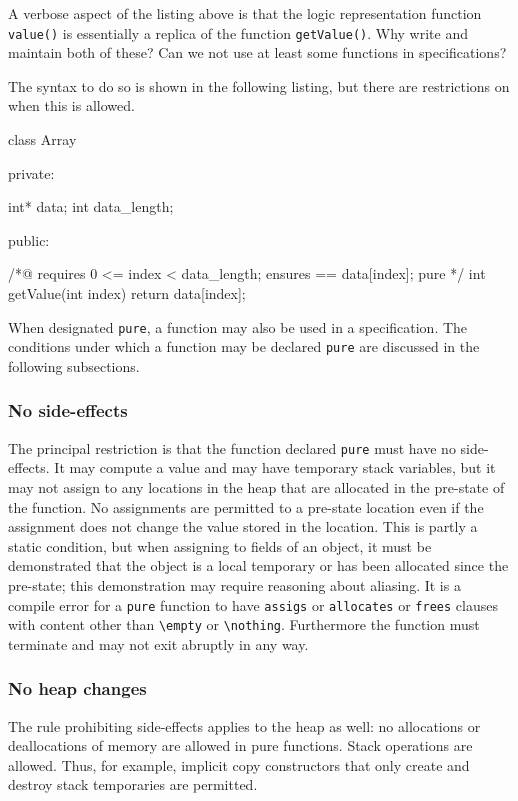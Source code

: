 \experimental

A verbose aspect of the listing above is that the logic representation function \lstinline|value()| is essentially a replica of
the \lang{} function \lstinline|getValue()|. Why write and maintain both of these? Can we not use at least some \lang{} functions in 
specifications?

The syntax to do so is shown in the following listing, but there are restrictions on when this is allowed.

\begin{listing-nonumber}
class Array {
	
  private:
	
    int* data;
    int data_length;
	
  public:
	
    /*@ 
      requires 0 <= index < data_length;
      ensures \result == data[index];
      pure
    */
    int getValue(int index) {
		return data[index];
    }	
}
\end{listing-nonumber}

When designated \lstinline|pure|, a \lang{} function may also be used in a \NAME{} specification. The conditions under which a 
\lang{} function may be declared \lstinline|pure| are discussed in the following subsections.

\subsubsection{No side-effects}
The principal restriction is that the function declared \lstinline|pure| must have no side-effects. It may compute a value and may have 
temporary stack variables, but it may not assign to any locations in the heap that are allocated in the pre-state of the function.
No assignments are permitted to a pre-state location even if the assignment does not change the value stored in the location.
This is partly a static condition, but when assigning to fields of an object, it must be demonstrated that the object is a local temporary or
has been allocated since the pre-state; this demonstration may require reasoning about aliasing. It is a compile error for a \lstinline|pure|
function to have \lstinline|assigs| or \lstinline|allocates| or \lstinline|frees| clauses with content other than \lstinline|\empty| or \lstinline|\nothing|.
Furthermore the function must terminate and may not exit abruptly in any way.

\subsubsection{No heap changes}
The rule prohibiting side-effects applies to the heap as well:
no allocations or deallocations of memory are allowed in pure functions.
Stack operations are allowed. Thus, for example,
 implicit copy constructors that 
only create and destroy stack temporaries are permitted.

